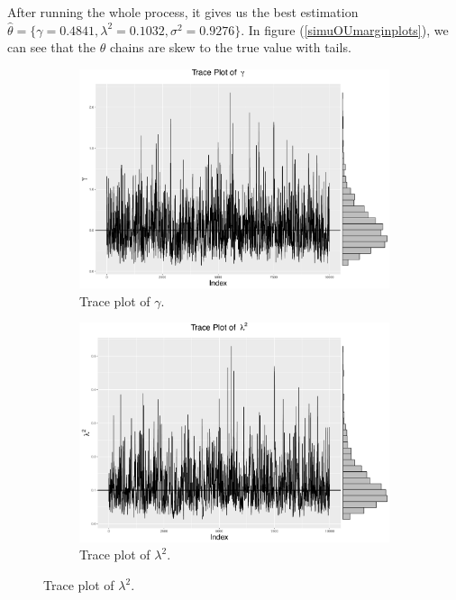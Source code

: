 After running the whole process, it gives us the best estimation $\hat{\theta} = \{\gamma=0.4841, \lambda^2=0.1032, \sigma^2=0.9276\}$. In figure (\ref{simuOUmarginplots}), we can see that the $\theta$ chains are skew to the true value with tails.
\begin{figure}[h]
\centering
 \begin{subfigure}[b]{0.3\textwidth}
     \includegraphics[width=\textwidth]{Chapters/05MCMCOU/plots/simudataOUtracegam.pdf}
     \caption{Trace plot of $\gamma$.}
\end{subfigure}
\begin{subfigure}[b]{0.3\textwidth}
    \includegraphics[width=\textwidth]{Chapters/05MCMCOU/plots/simudataOUtracelab2.pdf}
     \caption{Trace plot of $\lambda^2$.}
\end{subfigure}

\end{figure}
